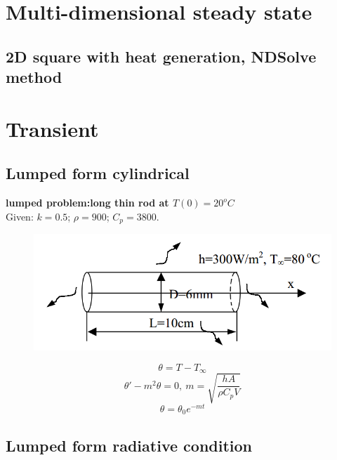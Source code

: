 \section{Multi-dimensional steady state}
\subsection{2D square with heat generation, NDSolve method}

\section{Transient}
\subsection{Lumped form cylindrical}
\begin{example}
\textbf{lumped problem:long thin rod at $T(0)=20^oC$}\\
Given: $k = 0.5$; $\rho= 900$; $C_p = 3800$.
\begin{figure}[H]
  \centering
    \includegraphics[scale=0.5]{figures/appendixA/4}
\end{figure}
$$\theta=T-T_\infty$$
$$\theta'-m^2\theta=0,~m=\sqrt{\frac{hA}{\rho C_pV}}$$
$$\theta=\theta_0e^{-mt}$$
\end{example}
\subsection{Lumped form radiative condition}

